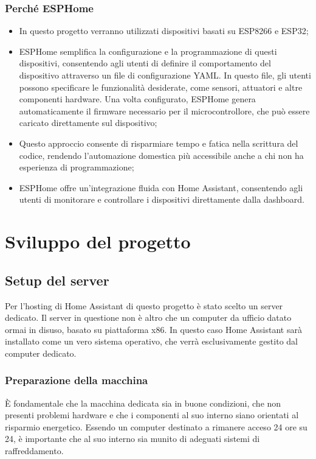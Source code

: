 \documentclass[11pt, a4paper]{article}
\begin{document}
\subsubsection{Perché ESPHome}
\begin{itemize}
    \item In questo progetto verranno utilizzati dispositivi basati su ESP8266 e ESP32;
    \item ESPHome semplifica la configurazione e la programmazione di questi dispositivi, 
    consentendo agli utenti di definire il comportamento del dispositivo attraverso un file di configurazione YAML.
    In questo file, gli utenti possono specificare le funzionalità desiderate, come sensori, attuatori e altre componenti hardware. 
    Una volta configurato, ESPHome genera automaticamente il firmware necessario per il microcontrollore, che può essere caricato direttamente sul dispositivo;
    \item Questo approccio consente di risparmiare tempo e fatica nella scrittura del codice, rendendo l'automazione domestica più accessibile anche a chi non ha esperienza di programmazione;
    \item ESPHome offre un'integrazione fluida con Home Assistant, consentendo agli utenti di monitorare e controllare i dispositivi direttamente dalla dashboard.

\end{itemize}

\section{Sviluppo del progetto}

\subsection{Setup del server}
Per l'hosting di Home Assistant di questo progetto è stato scelto un server dedicato.
Il server in questione non è altro che un computer da ufficio datato ormai in disuso, basato su
piattaforma x86.
In questo caso Home Assistant sarà installato come un vero sistema operativo, che verrà esclusivamente
gestito dal computer dedicato.

\subsubsection{Preparazione della macchina}
È fondamentale che la macchina dedicata sia in buone condizioni, che non presenti problemi hardware e che
i componenti al suo interno siano orientati al risparmio energetico. Essendo un computer destinato
a rimanere acceso 24 ore su 24, è importante che al suo interno sia munito di adeguati sistemi di raffreddamento.
\end{document}
